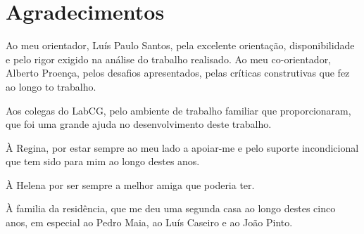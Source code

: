 \documentclass[
  oneside,
  11pt, a4paper,
  footinclude=true,
  headinclude=true,
  cleardoublepage=empty
]{scrbook}
\author{César Morais Perdigão}
\date{\myear} %
\begin{document}
	
    








	
\rm
	\cleardoublepage
	\setcounter{page}{0}

\chapter*{Agradecimentos}

Ao meu orientador, Luís Paulo Santos, pela excelente orientação, disponibilidade e pelo rigor exigido na análise do trabalho realisado.
Ao meu co-orientador, Alberto Proença, pelos desafios apresentados, pelas críticas construtivas que fez ao longo to trabalho.

Aos colegas do LabCG, pelo ambiente de trabalho familiar que proporcionaram, que foi uma grande ajuda no desenvolvimento deste trabalho.

À Regina, por estar sempre ao meu lado a apoiar-me e pelo suporte incondicional que tem sido para mim ao longo destes anos.

À Helena por ser sempre a melhor amiga que poderia ter.

À familia da residência, que me deu uma segunda casa ao longo destes cinco anos, em especial ao Pedro Maia, ao Luís Caseiro e ao João Pinto.
\end{document}
